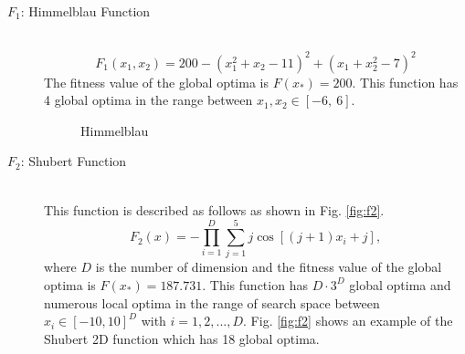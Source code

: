 \documentclass[conference]{IEEEtran}
\begin{document}
\begin{description}
\item[$F_1$: Himmelblau Function]\mbox{}\\
\begin{equation}
\label{eq:himmelblau}
F_1(x_1,x_2)=200-(x_1^2+x_2-11)^2+(x_1+x_2^2-7)^2
\end{equation}
The fitness value of the global optima is ${F(x_*)}=200$. This function has 4 global optima in the range between $x_1, x_2 \in [-6, \ 6]$.

\begin{figure}[h]
\begin{center}
\caption{Himmelblau}
\label{fig:f1}
\end{center}
\end{figure}

\item[$F_2$: Shubert Function]\mbox{}\\
 This function is described as follows as shown in Fig. \ref{fig:f2}.
 \begin{equation}
F_2(x) = -\prod_{i=1}^D \sum_{j=1}^5 j \cos[(j+1)x_i+j], 
\end{equation}
where $D$ is the number of dimension and the fitness value of the global optima is ${F(x_*)=187.731}$. This function has  $D \cdot 3^D $ global optima and numerous local optima in the range of search space between $x_i \in [-10, 10]^D$ with $i=1,2,...,D$. Fig. \ref{fig:f2} shows an example of the Shubert 2D function which has 18 global optima. 


\end{description}
\end{document}

